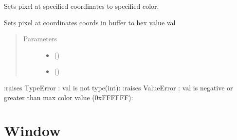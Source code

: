\documentclass[letterpaper,10pt,english,openany,oneside]{sphinxmanual}
\begin{document}
\begin{fulllineitems}

\begin{fulllineitems}
\label{\detokenize{dpav:dpav.vbuffer.VBuffer.write_pixel}}
\sphinxAtStartPar
Sets pixel at specified coordinates to specified color.

\sphinxAtStartPar
Sets pixel at coordinates coords in buffer to hex value val
\begin{quote}\begin{description}
\item[{Parameters}] \leavevmode\begin{itemize}
\item {} 
\sphinxAtStartPar
{} (\sphinxstyleliteralemphasis{\sphinxupquote{ (}}\sphinxstyleliteralemphasis{\sphinxupquote{)}}) \textendash{} 

\item {} 
\sphinxAtStartPar
{} () \textendash{} 

\end{itemize}

\end{description}\end{quote}

\sphinxAtStartPar
:raises TypeError : val is not type(int):
:raises ValueError : val is negative or greater than max color value (0xFFFFFF):

\end{fulllineitems}


\end{fulllineitems}



\section{Window}
\label{\detokenize{dpav:module-dpav.window}}\label{\detokenize{dpav:window}}
\end{document}
